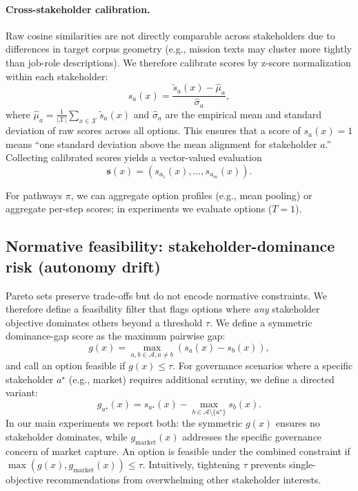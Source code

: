 \documentclass[sigconf,review]{acmart}
\begin{document}
\paragraph{Cross-stakeholder calibration.}
Raw cosine similarities are not directly comparable across stakeholders due to differences in target corpus geometry (e.g., mission texts may cluster more tightly than job-role descriptions). We therefore calibrate scores by z-score normalization within each stakeholder:
\begin{equation}
  s_a(x) = \frac{\tilde{s}_a(x) - \hat{\mu}_a}{\hat{\sigma}_a},
\end{equation}
where $\hat{\mu}_a = \frac{1}{|\mathcal{X}|}\sum_{x \in \mathcal{X}} \tilde{s}_a(x)$ and $\hat{\sigma}_a$ are the empirical mean and standard deviation of raw scores across all options. This ensures that a score of $s_a(x) = 1$ means ``one standard deviation above the mean alignment for stakeholder $a$.''
Collecting calibrated scores yields a vector-valued evaluation
\begin{equation}
  \mathbf{s}(x) = (s_{a_1}(x),\dots,s_{a_m}(x)).
\end{equation}

For pathways $\pi$, we can aggregate option profiles (e.g., mean pooling) or aggregate per-step scores; in experiments we evaluate options ($T=1$).

\subsection{Normative feasibility: stakeholder-dominance risk (autonomy drift)}
\label{subsec:constraint}
Pareto sets preserve trade-offs but do not encode normative constraints. We therefore define a feasibility filter that flags options where \emph{any} stakeholder objective dominates others beyond a threshold $\tau$.
We define a symmetric dominance-gap score as the maximum pairwise gap:
\begin{equation}
  g(x) = \max_{a,b \in \mathcal{A}, a \neq b} \left( s_a(x) - s_b(x) \right),
\end{equation}
and call an option feasible if $g(x) \le \tau$. For governance scenarios where a specific stakeholder $a^\star$ (e.g., market) requires additional scrutiny, we define a directed variant:
\begin{equation}
  g_{a^\star}(x) = s_{a^\star}(x) - \max_{b\in\mathcal{A}\setminus\{a^\star\}} s_b(x).
\end{equation}
In our main experiments we report both: the symmetric $g(x)$ ensures no stakeholder dominates, while $g_{\text{market}}(x)$ addresses the specific governance concern of market capture. An option is feasible under the combined constraint if $\max(g(x), g_{\text{market}}(x)) \le \tau$.
Intuitively, tightening $\tau$ prevents single-objective recommendations from overwhelming other stakeholder interests.
\end{document}
